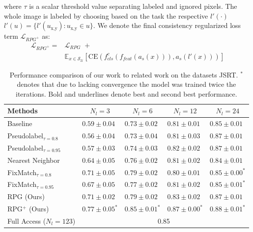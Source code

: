 \documentclass[letterpaper]{article} %
\begin{document}
where $\tau$ is a scalar threshold value separating labeled and ignored pixels.
The whole image is labeled by choosing based on the task the respective $l'(\cdot)$
$l'(u) = \{l'(u_{\text{x},\text{y}}) : u_{\text{x},\text{y}} \in u\}$.
We denote the final consistency regularized loss term $\mathcal{L}_{{RPG}^+}$ as:
\begin{equation}
\begin{aligned}
    \mathcal{L}_{{RPG}^+} = & \mathcal{L}_{RPG} \,\,+\\&
    \mathbb{E}_{x\in \mathcal{S}_\mathcal{U}}
    [\mathrm{CE}(f_{cls}^c(f_{feat}(\mathit{a}_s(x))),\mathit{a}_s(l'(x))) ]
\end{aligned}
\end{equation}


\begin{table}[bp]
  \centering
  \begin{tabular}{lllll}
  \toprule
  Methods&\multicolumn{1}{c}{$N_l=3$}&\multicolumn{1}{c}{$N_l=6$}&\multicolumn{1}{c}{$N_l=12$}&\multicolumn{1}{c}{$N_l=24$}\\
    \midrule
    Baseline &$0.59\pm0.04$&$0.73\pm0.02$&$0.81\pm0.01$&$0.85\pm0.01$\\
    Pseudolabel$_{\tau = 0.8}$~\cite{lee2013pseudo}  &$0.56\pm0.04$&$0.73\pm0.04$&$0.81\pm0.03$&\underline{$0.87\pm0.01$}\\
    Pseudolabel$_{\tau = 0.95}$~\cite{lee2013pseudo} &$0.57\pm0.03$&$0.74\pm0.03$&$0.82\pm0.02$&\underline{$0.87\pm0.01$}\\
    Nearest Neighbor                        &$0.64\pm0.05$&$0.76\pm0.02$&$0.81\pm0.02$&$0.84\pm0.01$\\
    FixMatch$_{\tau = 0.8}$~\cite{sohn2020fixmatch}  &\underline{$0.71\pm0.05$}&\underline{$0.79\pm0.02$}&$0.80\pm0.01$&$0.85\pm0.00^*$\\
    FixMatch$_{\tau = 0.95}$~\cite{sohn2020fixmatch} &$0.67\pm0.05$&$0.77\pm0.02$&$0.81\pm0.02$&$0.85\pm0.01^*$\\
    RPG    (Ours)                                 &\underline{$0.71\pm0.02$}&\underline{$0.79\pm0.02$}&\underline{$0.83\pm0.02$}&\underline{$0.87\pm0.01$}\\
    RPG$^+$ (Ours)& $\mathbf{0.77\pm0.05^*}$&$\mathbf{0.85\pm0.01^*}$&$\mathbf{0.87\pm0.00^*}$& $\mathbf{0.88\pm0.01^*}$\\\midrule
    Full Access ($N_l=123$) &\multicolumn{4}{c}{0.85}\\\bottomrule

  \end{tabular}

  \caption{Performance comparison of our work to related work on the datasets JSRT. $^*$ denotes that due to lacking convergence the model was trained twice the iterations. Bold and underlines denote best and second best performance.}
  \label{table:jsrt_results}

\end{table}
\end{document}
